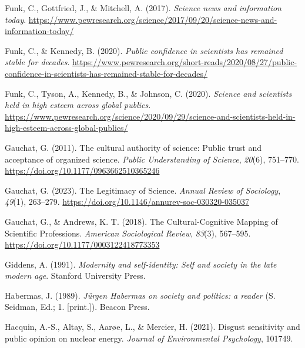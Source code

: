 \documentclass[
  jou,
  floatsintext,
  longtable,
  nolmodern,
  notxfonts,
  notimes,
  colorlinks=true,linkcolor=blue,citecolor=blue,urlcolor=blue]{apa7}
\newlength{\cslhangindent}
\newenvironment{CSLReferences}[2] %
 {\begin{list}{}{%
  \setlength{\itemindent}{0pt}
  \setlength{\leftmargin}{0pt}
  \setlength{\parsep}{0pt}
  \ifodd #1
   \setlength{\leftmargin}{\cslhangindent}
   \setlength{\itemindent}{-1\cslhangindent}
  \fi
  \setlength{\itemsep}{#2\baselineskip}}}
 {\end{list}}
\begin{document}
\begin{CSLReferences}{1}{0}
Funk, C., Gottfried, J., \& Mitchell, A. (2017). \emph{Science news and
information today}.
\url{https://www.pewresearch.org/science/2017/09/20/science-news-and-information-today/}

Funk, C., \& Kennedy, B. (2020). \emph{Public confidence in scientists
has remained stable for decades}.
\url{https://www.pewresearch.org/short-reads/2020/08/27/public-confidence-in-scientists-has-remained-stable-for-decades/}

Funk, C., Tyson, A., Kennedy, B., \& Johnson, C. (2020). \emph{Science
and scientists held in high esteem across global publics}.
\url{https://www.pewresearch.org/science/2020/09/29/science-and-scientists-held-in-high-esteem-across-global-publics/}

Gauchat, G. (2011). The cultural authority of science: Public trust and
acceptance of organized science. \emph{Public Understanding of Science},
\emph{20}(6), 751--770. \url{https://doi.org/10.1177/0963662510365246}

Gauchat, G. (2023). The Legitimacy of Science. \emph{Annual Review of
Sociology}, \emph{49}(1), 263--279.
\url{https://doi.org/10.1146/annurev-soc-030320-035037}

Gauchat, G., \& Andrews, K. T. (2018). The Cultural-Cognitive Mapping of
Scientific Professions. \emph{American Sociological Review},
\emph{83}(3), 567--595. \url{https://doi.org/10.1177/0003122418773353}

Giddens, A. (1991). \emph{Modernity and self-identity: Self and society
in the late modern age}. Stanford University Press.

Habermas, J. (1989). \emph{Jürgen Habermas on society and politics: a
reader} (S. Seidman, Ed.; 1. {[}print.{]}). Beacon Press.

Hacquin, A.-S., Altay, S., Aarøe, L., \& Mercier, H. (2021). Disgust
sensitivity and public opinion on nuclear energy. \emph{Journal of
Environmental Psychology}, 101749.


\end{CSLReferences}
\end{document}
